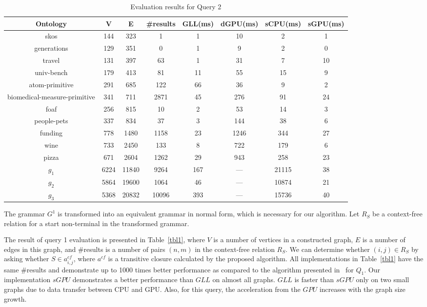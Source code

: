 \begin{table*}[h]
\centering
\caption{Evaluation results for Query 2}
\label{tbl2}

\begin{tabular}{ | c | c | c | c | c | c | c | c |}
\hline
Ontology & V & E & \#results & GLL(ms) & dGPU(ms) & sCPU(ms) & sGPU(ms)\\
\hline 
\hline
skos        & 144 & 323 & 1 & 1 & 10 & 2 & 1\\
generations & 129 & 351 & 0 & 1 & 9 & 2 & 0\\
travel      & 131 & 397 & 63 & 1 & 31 & 7 & 10\\
univ-bench  & 179 & 413 & 81 & 11 & 55 & 15 & 9\\
atom-primitive & 291 & 685 & 122 & 66 & 36 & 9 & 2\\
biomedical-measure-primitive & 341 & 711 & 2871 & 45 & 276 & 91 & 24\\
foaf        & 256 & 815 & 10 & 2 & 53 & 14 & 3\\
people-pets & 337 & 834 & 37 & 3 & 144 & 38 & 6\\
funding     & 778 & 1480 & 1158 & 23 & 1246 & 344 & 27\\
wine        & 733 & 2450 & 133 & 8 & 722 & 179 & 6\\
pizza       & 671 & 2604 & 1262 & 29 & 943 & 258 & 23\\
$g_{1}$     & 6224 & 11840 & 9264 & 167 & --- & 21115 & 38\\
$g_{2}$     & 5864 & 19600 & 1064 & 46 & --- & 10874 & 21\\
$g_{3}$     & 5368 & 20832 & 10096 & 393 & --- & 15736 & 40\\
\hline
\end{tabular}

\end{table*}


The grammar $G^1$ is transformed into an equivalent grammar in normal form, which is necessary for our algorithm. Let $R_S$ be a context-free relation for a start non-terminal in the transformed grammar.

The result of query 1 evaluation is presented in Table~\ref{tbl1}, where $V$ is a number of vertices in a constructed graph, $E$ is a number of edges in this graph, and \#results is a number of pairs $(n,m)$ in the context-free relation $R_S$. We can determine whether $(i,j) \in R_S$ by asking whether $S \in a^{cf}_{i,j}$, where $a^{cf}$ is a transitive closure calculated by the proposed algorithm. All implementations in Table~\ref{tbl1} have the same \#results and demonstrate up to 1000 times better performance as compared to the algorithm presented in~\cite{RDF} for $Q_1$. Our implementation $sGPU$ demonstrates a better performance than $GLL$ on almost all graphs. $GLL$ is faster than $sGPU$ only on two small graphs due to data transfer between CPU and GPU. Also, for this query, the acceleration from the $GPU$ increases with the graph size growth.


